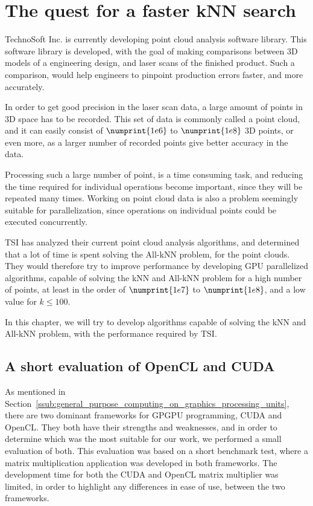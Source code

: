 
\chapter{The quest for a faster kNN search} %
\label{sec:the_quest_for_a_faster_knn_search}

TechnoSoft Inc\@. is currently developing point cloud analysis software library. This software library is developed, with the goal of making comparisons between 3D models of a engineering design, and laser scans of the finished product. Such a comparison, would help engineers to pinpoint production errors faster, and more accurately.

In order to get good precision in the laser scan data, a large amount of points in 3D space has to be recorded. This set of data is commonly called a point cloud, and it can easily consist of $\numprint{1e6}$ to $\numprint{1e8}$ 3D points, or even more, as a larger number of recorded points give better accuracy in the data.

Processing such a large number of point, is a time consuming task, and reducing the time required for individual operations become important, since they will be repeated many times. Working on point cloud data is also a problem seemingly suitable for parallelization, since operations on individual points could be executed concurrently.

TSI has analyzed their current point cloud analysis algorithms, and determined that a lot of time is spent solving the All-kNN problem, for the point clouds. They would therefore try to improve performance by developing GPU parallelized algorithms, capable of solving the kNN and All-kNN problem for a high number of points, at least in the order of $\numprint{1e7}$ to $\numprint{1e8}$, and a low value for $k\le100$.

In this chapter, we will try to develop algorithms capable of solving the kNN and All-kNN problem, with the performance required by TSI\@.

\section{A short evaluation of OpenCL and CUDA} %
\label{sub:a_short_evaluation_of_opencl_and_cuda}

As mentioned in Section~\ref{ssub:general_purpose_computing_on_graphics_processing_units}, there are two dominant frameworks for GPGPU programming, CUDA and OpenCL\@. They both have their strengths and weaknesses, and in order to determine which was the most suitable for our work, we performed a small evaluation of both. This evaluation was based on a short benchmark test, where a matrix multiplication application was developed in both frameworks. The development time for both the CUDA and OpenCL matrix multiplier was limited, in order to highlight any differences in ease of use, between the two frameworks.

